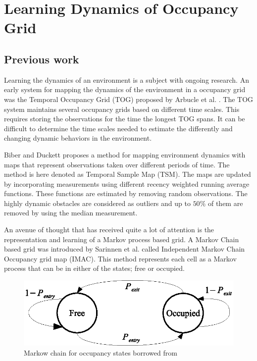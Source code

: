 \section{Learning Dynamics of Occupancy Grid}
\label{sec:learning_dynamics_of_env}

\subsection{Previous work}
Learning the dynamics of an environment is a subject with ongoing research.
An early system for mapping the dynamics of the environment in a occupancy grid was the Temporal Occupancy Grid (TOG) proposed by Arbucle et al. \cite{Arbuckle2002}. The TOG system maintains several occupancy grids based on different time scales. This requires storing the observations for the time the longest TOG spans. It can be difficult to determine the time scales needed to estimate the differently and changing dynamic behaviors in the environment.

Biber and Duckett \cite{Biber2005} proposes a method for mapping environment dynamics with maps that represent observations taken over different periods of time. The method is here denoted as Temporal Sample Map (TSM). The maps are updated by incorporating measurements using different recency weighted running average functions. These functions are estimated by removing random observations. The highly dynamic obstacles are considered as outliers and up to $50\%$ of them are removed by using the median measurement.

An avenue of thought that has received quite a lot of attention is the representation and learning of a Markov process based grid. A Markov Chain based grid was introduced by Sarinnen et al. \cite{Saarinen2012} called Independent Markov Chain Occupancy grid map (IMAC). This method represents each cell as a Markov process that can be in either of the states; free or occupied. 

\begin{figure}[tbph]
	\centering
	\includegraphics[width=0.7\linewidth]{chapters/mapping_of_dynamic_areas/figures/markow_occupancy_model}
	\caption{Markow chain for occupancy states borrowed from \cite{Saarinen2012}}
	\label{fig:markow_occupancy_model}
\end{figure}

